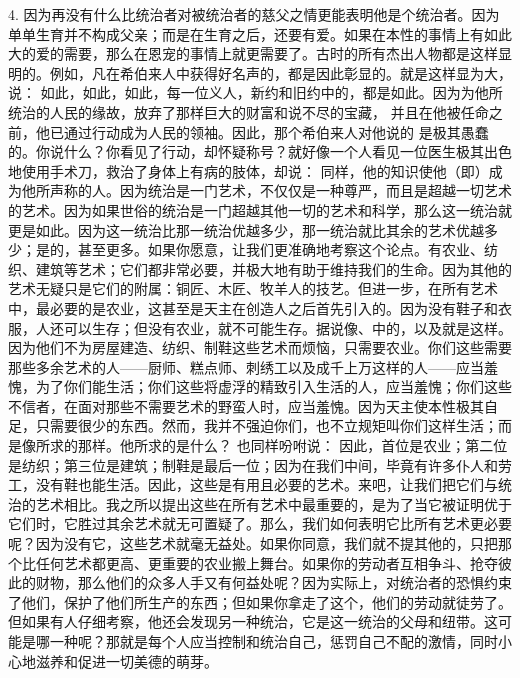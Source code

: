 4. 因为再没有什么比统治者对被统治者的慈父之情更能表明他是个统治者。因为单单生育并不构成父亲；而是在生育之后，还要有爱。如果在本性的事情上有如此大的爱的需要，那么在恩宠的事情上就更需要了。古时的所有杰出人物都是这样显明的。例如，凡在希伯来人中获得好名声的，都是因此彰显的。就是这样显为大，说： 如此，如此，如此，每一位义人，新约和旧约中的，都是如此。因为为他所统治的人民的缘故，放弃了那样巨大的财富和说不尽的宝藏， 并且在他被任命之前，他已通过行动成为人民的领袖。因此，那个希伯来人对他说的 是极其愚蠢的。你说什么？你看见了行动，却怀疑称号？就好像一个人看见一位医生极其出色地使用手术刀，救治了身体上有病的肢体，却说：  同样，他的知识使他（即）成为他所声称的人。因为统治是一门艺术，不仅仅是一种尊严，而且是超越一切艺术的艺术。因为如果世俗的统治是一门超越其他一切的艺术和科学，那么这一统治就更是如此。因为这一统治比那一统治优越多少，那一统治就比其余的艺术优越多少；是的，甚至更多。如果你愿意，让我们更准确地考察这个论点。有农业、纺织、建筑等艺术；它们都非常必要，并极大地有助于维持我们的生命。因为其他的艺术无疑只是它们的附属：铜匠、木匠、牧羊人的技艺。但进一步，在所有艺术中，最必要的是农业，这甚至是天主在创造人之后首先引入的。因为没有鞋子和衣服，人还可以生存；但没有农业，就不可能生存。据说像、中的，以及就是这样。因为他们不为房屋建造、纺织、制鞋这些艺术而烦恼，只需要农业。你们这些需要那些多余艺术的人——厨师、糕点师、刺绣工以及成千上万这样的人——应当羞愧，为了你们能生活；你们这些将虚浮的精致引入生活的人，应当羞愧；你们这些不信者，在面对那些不需要艺术的野蛮人时，应当羞愧。因为天主使本性极其自足，只需要很少的东西。然而，我并不强迫你们，也不立规矩叫你们这样生活；而是像所求的那样。他所求的是什么？ 也同样吩咐说： 因此，首位是农业；第二位是纺织；第三位是建筑；制鞋是最后一位；因为在我们中间，毕竟有许多仆人和劳工，没有鞋也能生活。因此，这些是有用且必要的艺术。来吧，让我们把它们与统治的艺术相比。我之所以提出这些在所有艺术中最重要的，是为了当它被证明优于它们时，它胜过其余艺术就无可置疑了。那么，我们如何表明它比所有艺术更必要呢？因为没有它，这些艺术就毫无益处。如果你同意，我们就不提其他的，只把那个比任何艺术都更高、更重要的农业搬上舞台。如果你的劳动者互相争斗、抢夺彼此的财物，那么他们的众多人手又有何益处呢？因为实际上，对统治者的恐惧约束了他们，保护了他们所生产的东西；但如果你拿走了这个，他们的劳动就徒劳了。但如果有人仔细考察，他还会发现另一种统治，它是这一统治的父母和纽带。这可能是哪一种呢？那就是每个人应当控制和统治自己，惩罚自己不配的激情，同时小心地滋养和促进一切美德的萌芽。\par

